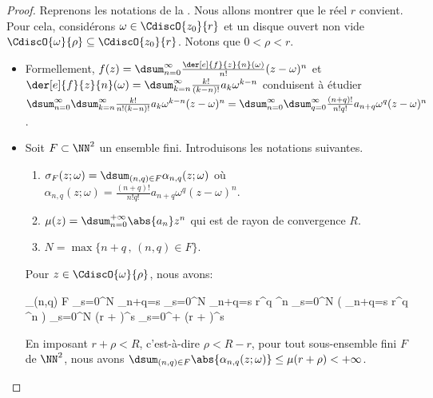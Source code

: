 \begin{proof}
    Reprenons les notations de la .
    Nous allons montrer que le réel $r$ convient.
    Pour cela, considérons $\omega \in \CdiscO{z_0}{r}$
    et
    un disque ouvert non vide $\CdiscO{\omega}{\rho} \subseteq \CdiscO{z_0}{r}$.
    Notons que $0 < \rho < r$.
	\begin{itemize}
		\item Formellement,
		$f(z) = \dsum_{n = 0}^{\infty} \frac{\der[e]{f}{z}{n}(\omega)}{n!} (z - \omega)^n$
		et
		$\der[e]{f}{z}{n}(\omega) = \dsum_{k = n}^{\infty} \frac{k!}{(k-n)!} a_k \omega^{k - n}$
		conduisent à étudier
		$ \dsum_{n = 0}^{\infty} \dsum_{k = n}^{\infty} \frac{k!}{n! (k-n)!} a_k \omega^{k - n} (z - \omega)^n
		= \dsum_{n = 0}^{\infty} \dsum_{q = 0}^{\infty} \frac{(n+q)!}{n! q!} a_{n+q} \omega^q (z - \omega)^n$.
	

		\item Soit $F \subset \NN^2$ un ensemble fini.
		Introduisons les notations suivantes.
		\begin{enumerate}
			\item $\sigma_F(z ; \omega) = \dsum_{(n,q) \in F} \alpha_{n,q}(z ; \omega)$
			où
			$\alpha_{n,q}(z ; \omega) = \frac{(n+q)!}{n! q!} a_{n+q} \omega^q (z - \omega)^n$.

			\item $\mu(z) = \dsum_{n = 0}^{+\infty} \abs{a_n} z^n$ qui est de rayon de convergence $R$.

			\item $N = \max \big\{ n + q \,,\, (n,q) \in F \big\}$.
		\end{enumerate}
		
		\noindent
		Pour $z \in \CdiscO{\omega}{\rho}$, nous avons:
		
		\noindent\kern-6pt
		\begin{stepcalc}[style=sar, ope=\leq]
			\dsum_{(n,q) \in F} 
		\explnext{}
			\dsum_{s=0}^{N} \dsum_{n+q=s} 
		\explnext{}
			\dsum_{s=0}^{N} \dsum_{n+q=s}   r^q \rho^n
		\explnext{}
			\dsum_{s=0}^{N}  \big( \dsum_{n+q=s}  r^q \rho^n \big)
		\explnext{}
			\dsum_{s=0}^{N}  (r + \rho)^s
		\explnext{}
			\dsum_{s=0}^{+\infty}  (r + \rho)^s
		\end{stepcalc}
		
		\noindent
		En imposant $r + \rho < R$, c'est-à-dire $\rho < R - r$, 
		pour tout sous-ensemble fini $F$ de $\NN^2$, nous avons
		$\dsum_{(n,q) \in F} \abs{\alpha_{n,q}(z ; \omega)} \leq \mu(r + \rho) < +\infty$.
		

\end{itemize}
\end{proof}
